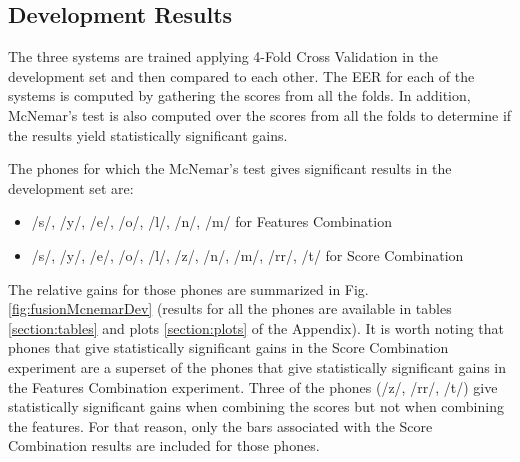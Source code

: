 \subsection{Development Results}

The three systems are trained applying 4-Fold Cross Validation
in the development set and then compared to each other.
The EER for each of
the systems is computed
by gathering the scores from all the folds.
In addition, McNemar's test is also computed
over the scores from all the folds to determine if the
results yield statistically significant gains.

The phones for which the McNemar's test gives significant results
in the development set are:

\begin{itemize}
	\item /s/, /y/, /e/, /o/, /l/, /n/, /m/ for Features Combination
	\item /s/, /y/, /e/, /o/, /l/, /z/, /n/, /m/, /rr/, /t/ for Score Combination
\end{itemize}

The relative gains for those phones are summarized in
Fig. \ref{fig:fusionMcnemarDev} (results for all the phones are available
in tables \ref{section:tables} and plots \ref{section:plots} of the
Appendix). It is worth noting that phones that
give statistically significant gains in
the Score Combination experiment are a superset of the phones that give statistically
significant gains in the Features Combination experiment.
Three of the phones (/z/, /rr/, /t/) give statistically significant gains
when combining the scores but not when combining the features.
For that reason, only the bars associated with the Score Combination results are
included for those phones.

